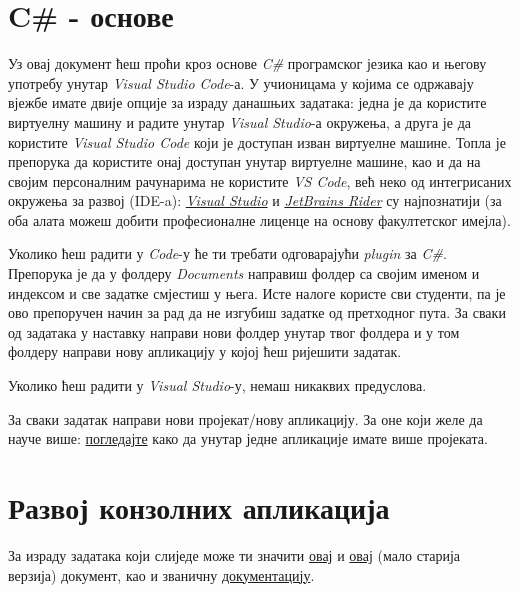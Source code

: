 \documentclass[11pt,a4paper]{article}
\begin{document}
\section{C\# - основе}

Уз овај документ ћеш проћи кроз основе \emph{C\#} програмског језика као
и његову употребу унутар \emph{Visual Studio Code}-а. У учионицама у
којима се одржавају вјежбе имате двије опције за израду данашњих
задатака: једна је да користите виртуелну машину и радите унутар
\emph{Visual Studio}-а окружења, а друга је да користите \emph{Visual
Studio Code} који је доступан изван виртуелне машине. Топла је препорука
да користите онај доступан унутар виртуелне машине, као и да на својим
персоналним рачунарима не користите \emph{VS Code}, већ неко од
интегрисаних окружења за развој (IDE-a):
\href{https://visualstudio.microsoft.com/}{\emph{Visual Studio}} и
\href{https://www.jetbrains.com/rider/}{\emph{JetBrains Rider}} су
најпознатији (за оба алата можеш добити професионалне лиценце на основу
факултетског имејла).

Уколико ћеш радити у \emph{Code}-у ће ти требати одговарајући
\emph{plugin} за \emph{C\#}. Препорука је да у фолдеру \emph{Documents}
направиш фолдер са својим именом и индексом и све задатке смјестиш у
њега. Исте налоге користе сви студенти, па је ово препоручен начин за
рад да не изгубиш задатке од претходног пута. За сваки од задатака у
наставку направи нови фолдер унутар твог фолдера и у том фолдеру направи
нову апликацију у којој ћеш ријешити задатак.

Уколико ћеш радити у \emph{Visual Studio}-у, немаш никаквих предуслова.

За сваки задатак направи нови пројекат/нову апликацију. За оне који желе
да науче више:
\href{https://learn.microsoft.com/en-us/previous-versions/visualstudio/visual-studio-2015/ide/adding-and-removing-project-items?view=vs-2015}{погледајте}
како да унутар једне апликације имате више пројеката.

\section{Развој конзолних
апликација}

За израду задатака који слиједе може ти значити
\href{https://www.codecademy.com/learn/learn-c-sharp/modules/csharp-hello-world/cheatsheet}{овај}
и
\href{https://begincodingnow.com/wp-content/uploads/2019/02/CSharpCheatSheetV1.pdf}{овај}
(мало старија верзија) документ, као и званичну
\href{https://learn.microsoft.com/en-us/dotnet/csharp/language-reference/}{документацију}.
\end{document}

